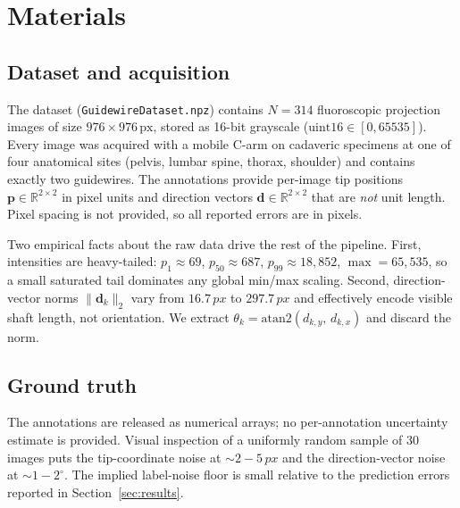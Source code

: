 \documentclass[conference,10pt,letterpaper]{IEEEtran}
\newcommand{\px}{\,px}
\begin{document}
\section{Materials}
\label{sec:materials}

\subsection{Dataset and acquisition}
The dataset (\texttt{GuidewireDataset.npz}) contains $N{=}314$ fluoroscopic
projection images of size $976{\times}976\,\mathrm{px}$, stored as 16-bit
grayscale ($\mathrm{uint16}\in[0,65535]$). Every image was acquired with a
mobile C-arm on cadaveric specimens at one of four anatomical sites
(pelvis, lumbar spine, thorax, shoulder) and contains exactly two
guidewires. The annotations provide per-image tip positions
$\mathbf{p}\in\mathbb{R}^{2\times 2}$ in pixel units and direction vectors
$\mathbf{d}\in\mathbb{R}^{2\times 2}$ that are \emph{not} unit length.
Pixel spacing is not provided, so all reported errors are in pixels.

Two empirical facts about the raw data drive the rest of the pipeline.
First, intensities are heavy-tailed: $p_1{\approx}69$, $p_{50}{\approx}687$,
$p_{99}{\approx}18{,}852$, $\max{=}65{,}535$, so a small saturated tail
dominates any global min/max scaling. Second, direction-vector norms
$\|\mathbf{d}_k\|_2$ vary from $16.7\px$ to $297.7\px$ and effectively
encode visible shaft length, not orientation. We extract
$\theta_k = \mathrm{atan2}(d_{k,y},\,d_{k,x})$ and discard the norm.

\subsection{Ground truth}
The annotations are released as numerical arrays; no per-annotation
uncertainty estimate is provided. Visual inspection of a uniformly random
sample of 30 images puts the tip-coordinate noise at $\sim 2{-}5\px$ and
the direction-vector noise at $\sim 1{-}2^\circ$. The implied label-noise
floor is small relative to the prediction errors reported in
Section~\ref{sec:results}.
\end{document}
